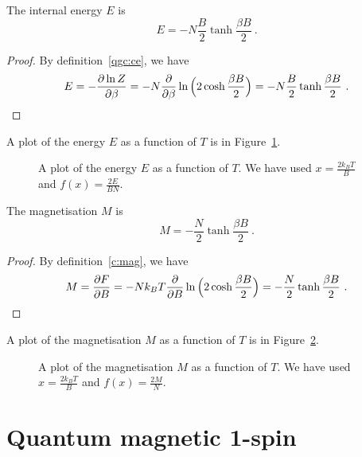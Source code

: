     The internal energy $E$ is 
    \begin{equation*}
        E = - N \frac{B}{2} \tanh \frac{\beta B}{2} ~.
    \end{equation*}
    \begin{proof}
        By definition~\eqref{qgc:ce}, we have 
        \begin{equation*}
            E = - \frac{\partial\ln Z}{\partial\beta} = - N \frac{\partial}{\partial\beta} \ln \Big (2 \cosh \frac{\beta B}{2} \Big) = - N \frac{B}{2} \tanh \frac{\beta B}{2} ~.
        \end{equation*}
    \end{proof}
    A plot of the energy $E$ as a function of $T$ is in Figure~\ref{qm:e}.
    \begin{figure}
        \centering
        \caption{A plot of the energy $E$ as a function of $T$. We have used $x = \frac{2 k_B T}{B} $ and $f(x) = \frac{2E}{BN}$.}
        \label{qm:e}
    \end{figure}

    The magnetisation $M$ is 
    \begin{equation*}
        M = - \frac{N}{2} \tanh \frac{\beta B}{2} ~. 
    \end{equation*}
    \begin{proof}
        By definition~\eqref{c:mag}, we have
        \begin{equation*}
            M = \frac{\partial F}{\partial B} = - N k_B T \frac{\partial}{\partial B} \ln \Big ( 2 \cosh \frac{\beta B}{2} \Big) = - \frac{N}{2} \tanh \frac{\beta B}{2} ~.
        \end{equation*}
    \end{proof}
    A plot of the magnetisation $M$ as a function of $T$ is in Figure~\ref{qm:m}.
    \begin{figure}
        \centering
        \caption{A plot of the magnetisation $M$ as a function of $T$. We have used $x = \frac{2 k_B T}{B} $ and $f(x) = \frac{2M}{N}$.}
        \label{qm:m}
    \end{figure}

\section{Quantum magnetic 1-spin}

